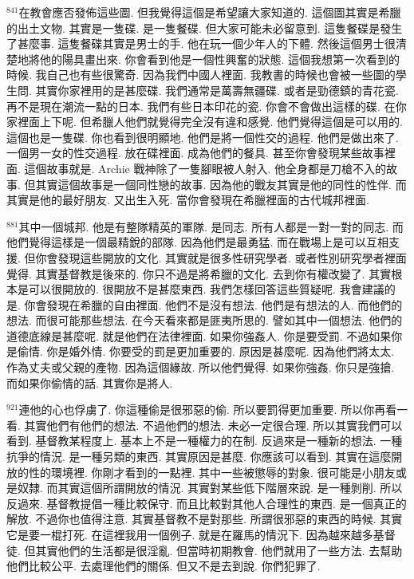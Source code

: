 \documentclass{book}
\begin{document}
$^{841}$在教會應否發佈這些圖.
但我覺得這個是希望讓大家知道的.
這個圖其實是希臘的出土文物.
其實是一隻碟.
是一隻餐碟.
但大家可能未必留意到.
這隻餐碟是發生了甚麼事.
這隻餐碟其實是男士的手.
他在玩一個少年人的下體.
然後這個男士很清楚地將他的陽具畫出來.
你會看到他是一個性興奮的狀態.
這個我想第一次看到的時候.
我自己也有些很驚奇.
因為我們中國人裡面.
我教書的時候也會被一些圖的學生問.
其實你家裡用的是甚麼碟.
我們通常是萬壽無疆碟.
或者是勁德鎮的青花瓷.
再不是現在潮流一點的日本.
我們有些日本印花的瓷.
你會不會做出這樣的碟.
在你家裡面上下呢.
但希臘人他們就覺得完全沒有違和感覺.
他們覺得這個是可以用的.
這個也是一隻碟.
你也看到很明顯地.
他們是將一個性交的過程.
他們是做出來了.
一個男一女的性交過程.
放在碟裡面.
成為他們的餐具.
甚至你會發現某些故事裡面.
這個故事就是.
Archie 戰神除了一隻腳眼被人射入.
他全身都是刀槍不入的故事.
但其實這個故事是一個同性戀的故事.
因為他的戰友其實是他的同性的性伴.
而其實是他的最好朋友.
又出生入死.
當你會發現在希臘裡面的古代城邦裡面.

$^{881}$其中一個城邦.
他是有整隊精英的軍隊.
是同志.
所有人都是一對一對的同志.
而他們覺得這樣是一個最精銳的部隊.
因為他們是最勇猛.
而在戰場上是可以互相支援.
但你會發現這些開放的文化.
其實就是很多性研究學者.
或者性別研究學者裡面覺得.
其實基督教是後來的.
你只不過是將希臘的文化.
去到你有權改變了.
其實根本是可以很開放的.
很開放不是甚麼東西.
我們怎樣回答這些質疑呢.
我會建議的是.
你會發現在希臘的自由裡面.
他們不是沒有想法.
他們是有想法的人.
而他們的想法.
而很可能那些想法.
在今天看來都是匪夷所思的.
譬如其中一個想法.
他們的道德底線是甚麼呢.
就是他們在法律裡面.
如果你強姦人.
你是要受罰.
不過如果你是偷情.
你是婚外情.
你要受的罰是更加重要的.
原因是甚麼呢.
因為他們將太太.
作為丈夫或父親的產物.
因為這個緣故.
所以他們覺得.
如果你強姦.
你只是強搶.
而如果你偷情的話.
其實你是將人.

$^{921}$連他的心也俘虜了.
你這種偷是很邪惡的偷.
所以要罰得更加重要.
所以你再看一看.
其實他們有他們的想法.
不過他們的想法.
未必一定很合理.
所以其實我們可以看到.
基督教某程度上.
基本上不是一種權力的在制.
反過來是一種新的想法.
一種抗爭的情況.
是一種另類的東西.
其實原因是甚麼.
你應該可以看到.
其實在這麼開放的性的環境裡.
你剛才看到的一點裡.
其中一些被懲辱的對象.
很可能是小朋友或是奴隸.
而其實這個所謂開放的情況.
其實對某些低下階層來說.
是一種剝削.
所以反過來.
基督教提倡一種比較保守.
而且比較對其他人合理性的東西.
是一個真正的解放.
不過你也值得注意.
其實基督教不是對那些.
所謂很邪惡的東西的時候.
其實它是要一棍打死.
在這裡我用一個例子.
就是在羅馬的情況下.
因為越來越多基督徒.
但其實他們的生活都是很淫亂.
但當時初期教會.
他們就用了一些方法.
去幫助他們比較公平.
去處理他們的關係.
但又不是去到說.
你們犯罪了.
\end{document}

